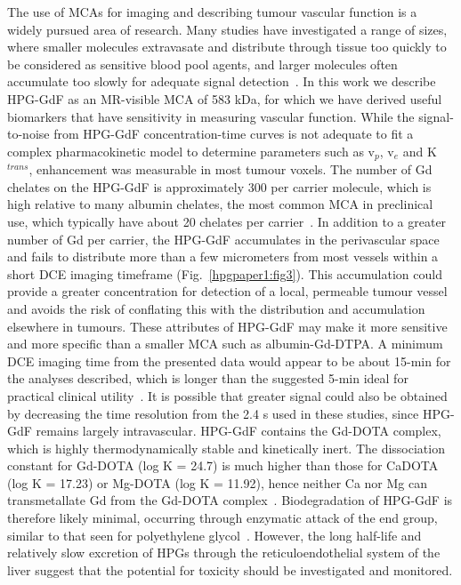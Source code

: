 The use of \acs{MCA}s for imaging and describing tumour vascular function is a widely pursued area of research.
Many studies have investigated a range of sizes, where smaller molecules extravasate and distribute through tissue too quickly to be considered as sensitive blood pool agents, and larger molecules often accumulate too slowly for adequate signal detection~\cite{Kyle:2007ch,Tang:2013fi,Sourbron:2011ce}.
In this work we describe \acs{HPG-GdF} as an MR-visible \acs{MCA} of 583 \acs{kDa}, for which we have derived useful biomarkers that have sensitivity in measuring vascular function.
While the signal-to-noise from \acs{HPG-GdF} concentration-time curves is not adequate to fit a complex pharmacokinetic model to determine parameters such as v$_p$, v$_e$ and K$^{trans}$, enhancement was measurable in most tumour voxels.
The number of Gd chelates on the \acs{HPG-GdF} is approximately 300 per carrier molecule, which is high relative to many albumin chelates, the most common \acs{MCA} in preclinical use, which typically have about 20 chelates per carrier~\cite{Ogan:1987tg}.
In addition to a greater number of Gd per carrier, the \acs{HPG-GdF} accumulates in the perivascular space and fails to distribute more than a few micrometers from most vessels within a short DCE imaging timeframe (Fig.~\ref{hpgpaper1:fig3}).
This accumulation could provide a greater concentration for detection of a local, permeable tumour vessel and avoids the risk of conflating this with the distribution and accumulation elsewhere in tumours.
These attributes of \acs{HPG-GdF} may make it more sensitive and more specific than a smaller MCA such as albumin-Gd-DTPA.
A minimum DCE imaging time from the presented data would appear to be about 15-min for the analyses described, which is longer than the suggested 5-min ideal for practical clinical utility~\cite{Turetschek:2004bw}.
It is possible that greater signal could also be obtained by decreasing the time resolution from the 2.4 s used in these studies, since \acs{HPG-GdF} remains largely intravascular.
\acs{HPG-GdF} contains the \acs{Gd-DOTA} complex, which is highly thermodynamically stable and kinetically inert.
The dissociation constant for \acs{Gd-DOTA} (log K = 24.7) is much higher than those for CaDOTA (log K = 17.23) or Mg-DOTA (log K = 11.92), hence neither Ca nor Mg can transmetallate Gd from the Gd-DOTA complex~\cite{Baranyai:2005ta}.
Biodegradation of \acs{HPG-GdF} is therefore likely minimal, occurring through enzymatic attack of the end group, similar to that seen for polyethylene glycol~\cite{Kawai:2002fc}.
However, the long half-life and relatively slow excretion of HPGs through the reticuloendothelial system of the liver suggest that the potential for toxicity should be investigated and monitored.
